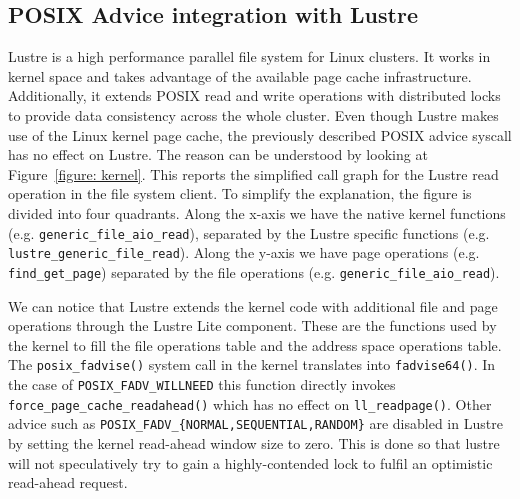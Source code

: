 \subsection{POSIX Advice integration with Lustre}
\label{subsec: posix_advice_lustre}
Lustre is a high performance parallel file system for Linux clusters. It works in kernel space and takes advantage of the available page cache infrastructure. Additionally, it extends POSIX read and write operations with distributed locks to provide data 
consistency across the whole cluster. Even though Lustre makes use of the Linux kernel page cache, the previously described POSIX advice syscall has no effect on Lustre. The reason can be understood by looking at Figure~\ref{figure: kernel}. This reports the 
simplified call graph for the Lustre read operation in the file system client. To simplify the explanation, the figure is divided into four quadrants. Along the x-axis we have the native kernel functions (e.g. \texttt{generic\_file\_aio\_read}), separated by the 
Lustre specific functions (e.g. \texttt{lustre\_generic\_file\_read}). Along the y-axis we have page operations (e.g. \texttt{find\_get\_page}) separated by the file operations (e.g. \texttt{generic\_file\_aio\_read}). 

We can notice that Lustre extends the kernel code with additional file and page operations through the Lustre Lite component. These are the functions used by the kernel to fill the file operations table and the address space operations table. The 
\texttt{posix\_fadvise()} system call in the kernel translates into \texttt{fadvise64()}. In the case of \texttt{POSIX\_FADV\_WILLNEED} this function directly invokes \texttt{force\_page\_cache\_readahead()} which has no effect on 
\texttt{ll\_readpage()}. Other advice such as \texttt{POSIX\_FADV\_\{NORMAL,SEQUENTIAL,RANDOM\}} are disabled in Lustre by setting the kernel read-ahead window size to zero. This is done so that lustre will not speculatively try to gain a highly-contended 
lock to fulfil an optimistic read-ahead request.

